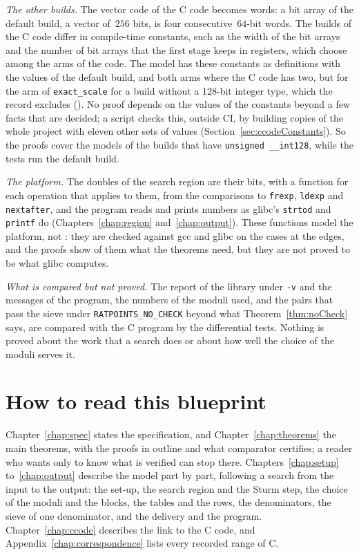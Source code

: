 \emph{The other builds.} The vector code of the C code becomes words: a bit array of the default
build, a vector of~$256$ bits, is four consecutive~$64$-bit words. The builds of the C code differ
in compile-time constants, such as the width of the bit arrays and the number of bit arrays that the
first stage keeps in registers, which choose among the arms of the code. The model has these
constants as definitions with the values of the default build, and both arms where the C code has
two, but for the arm of \verb|exact_scale| for a build without a 128-bit integer type, which the
record excludes (). No proof depends on the values of the
constants beyond a few facts that are decided; a script checks this, outside CI, by building
copies of the whole project with eleven other sets of values (Section~\ref{sec:ccodeConstants}). So
the proofs cover the models of the builds that have \verb|unsigned __int128|, while the tests run
the default build.

\emph{The platform.} The doubles of the search region are their bits, with a function for each
operation that \ratpoints{} applies to them, from the comparisons to \verb|frexp|, \verb|ldexp| and
\verb|nextafter|, and the program reads and prints numbers as glibc's \verb|strtod| and
\verb|printf| do (Chapters~\ref{chap:region} and~\ref{chap:output}). These functions model the
platform, not \ratpoints{}: they are checked against gcc and glibc on the cases at the edges, and the
proofs show of them what the theorems need, but they are not proved to be what glibc computes.

\emph{What is compared but not proved.} The report of the library under \verb|-v| and the messages
of the program, the numbers of the moduli used, and the pairs that pass the sieve under
\verb|RATPOINTS_NO_CHECK| beyond what Theorem~\ref{thm:noCheck} says, are compared with the C
program by the differential tests. Nothing is proved about the work that a search does or about how
well the choice of the moduli serves it.

\section{How to read this blueprint}\label{sec:overviewReading}

Chapter~\ref{chap:spec} states the specification, and Chapter~\ref{chap:theorems} the main
theorems, with the proofs in outline and what comparator certifies; a reader who wants only to know
what is verified can stop there. Chapters~\ref{chap:setup} to~\ref{chap:output} describe the model
part by part, following a search from the input to the output: the set-up, the search region and
the Sturm step, the choice of the moduli and the blocks, the tables and the rows, the denominators,
the sieve of one denominator, and the delivery and the program. Chapter~\ref{chap:ccode} describes
the link to the C code, and Appendix~\ref{chap:correspondence} lists every recorded range of C.

